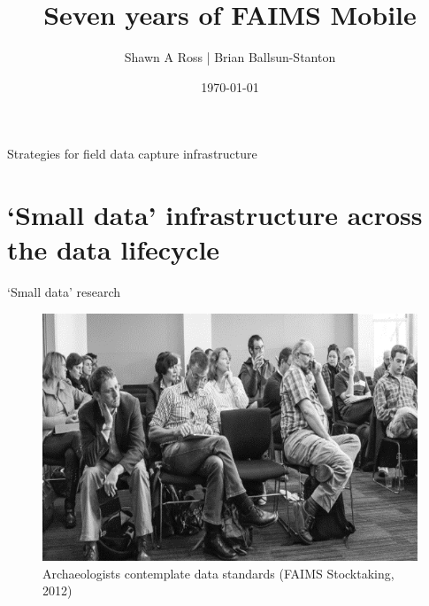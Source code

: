 \documentclass[aspectratio=169, 12pt]{beamer} %
\title{Seven years of FAIMS Mobile} %
\author{Shawn A Ross | Brian Ballsun-Stanton}               %
\institute{Faculty of Arts}         %
\date{\today}                 %
\begin{document}

\maketitle

  

\begin{frame}{Strategies for field data capture infrastructure}
  \tableofcontents
\end{frame}

%



\section{`Small data' infrastructure across the data lifecycle}

\begin{frame}{`Small data' research}
 \begin{figure}[H]
    \centering
        \includegraphics[height=.75\textheight]{figures/Archaeologists-standards.png}
        \caption{Archaeologists contemplate data standards (FAIMS Stocktaking, 2012)}
        \label{fig:figure7}
 \end{figure}
\end{frame}
\end{document}
